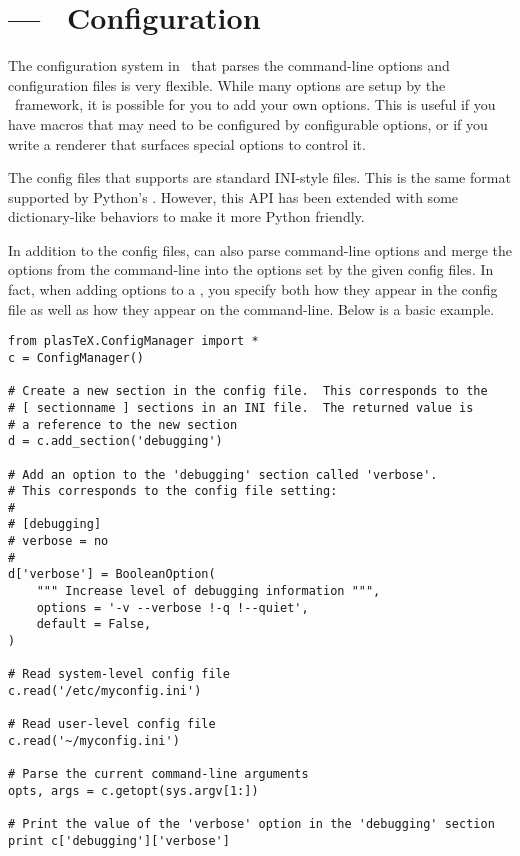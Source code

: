 
\section{ --- \plasTeX\ Configuration}


The configuration system in \plasTeX\ that parses the command-line options
and configuration files is very flexible.  While many options are setup
by the \plasTeX\ framework, it is possible for you to add your own options.
This is useful if you have macros that may need to be configured by 
configurable options, or if you write a renderer that surfaces special options
to control it.

The config files that  supports are standard INI-style
files.  This is the same format supported by Python's .
However, this API has been extended with some dictionary-like behaviors
to make it more Python friendly.

In addition to the config files,  can also parse
command-line options and merge the options from the command-line into
the options set by the given config files.  In fact, when adding options
to a , you specify both how they appear in the config
file as well as how they appear on the command-line.  Below is a basic 
example.

\begin{verbatim}
from plasTeX.ConfigManager import *
c = ConfigManager()

# Create a new section in the config file.  This corresponds to the
# [ sectionname ] sections in an INI file.  The returned value is 
# a reference to the new section
d = c.add_section('debugging')

# Add an option to the 'debugging' section called 'verbose'.
# This corresponds to the config file setting:
#
# [debugging]
# verbose = no
#
d['verbose'] = BooleanOption(
    """ Increase level of debugging information """,
    options = '-v --verbose !-q !--quiet',
    default = False,
)

# Read system-level config file
c.read('/etc/myconfig.ini')

# Read user-level config file
c.read('~/myconfig.ini')

# Parse the current command-line arguments
opts, args = c.getopt(sys.argv[1:])

# Print the value of the 'verbose' option in the 'debugging' section
print c['debugging']['verbose']
\end{verbatim}

